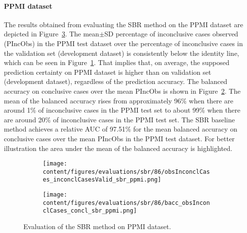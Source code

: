 


\paragraph{PPMI dataset}

The results obtained from evaluating the SBR method on the PPMI dataset 
are depicted in Figure~\ref{fig:perf_results_sbr_ppmi}.
The mean$\pm$SD percentage of inconclusive cases observed (PIncObs) in the PPMI test dataset 
over the percentage of inconclusive cases in the validation set (development dataset) 
is consistently below the identity line, 
which can be seen in Figure~\ref{fig:obsInconclCases_inconclCasesValid_sbr_ppmi}.
That implies that, on average, the supposed prediction certainty on PPMI dataset is higher than on validation set (development dataset),
regardless of the prediction accuracy.
The balanced accuracy on conclusive cases over the mean PIncObs is shown 
in Figure~\ref{fig:bacc_obsInconclCases_concl_sbr_ppmi}.
The mean of the balanced accuracy rises from approximately 96\% 
when there are around 1\% of inconclusive cases in the PPMI test set to about 99\% 
when there are around 20\% of inconclusive cases in the PPMI test set.
The SBR baseline method achieves a relative AUC of 97.51\% for the mean balanced accuracy on conclusive cases 
over the mean PIncObs in the PPMI test dataset.
For better illustration the area under the mean of the balanced accuracy is highlighted.


\begin{figure}[ht]
  \begin{subfigure}{0.9\textwidth}
    \centering
    \texttt{[image: content/figures/evaluations/sbr/86/obsInconclCases\_inconclCasesValid\_sbr\_ppmi.png]}
    \label{fig:obsInconclCases_inconclCasesValid_sbr_ppmi}
  \end{subfigure}
  \hfill
  \begin{subfigure}{0.9\textwidth}
    \centering
    \texttt{[image: content/figures/evaluations/sbr/86/bacc\_obsInconclCases\_concl\_sbr\_ppmi.png]}
    \label{fig:bacc_obsInconclCases_concl_sbr_ppmi}
  \end{subfigure}
  \caption{Evaluation of the SBR method on PPMI dataset.}
  \label{fig:perf_results_sbr_ppmi}
\end{figure}



